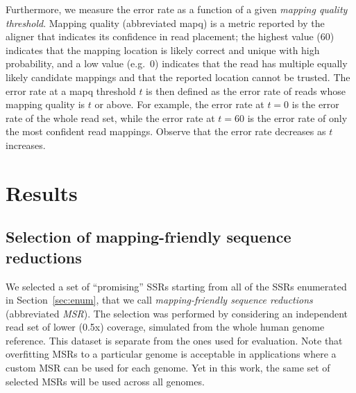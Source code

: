 \documentclass[
  11pt,
  twoside]{scrbook}
\begin{document}
Furthermore, we measure the error rate as a function of a given \emph{mapping quality
threshold}. Mapping quality (abbreviated mapq) is a metric reported by the
aligner that indicates its confidence in read placement; the highest value (60)
indicates that the mapping location is likely correct and unique with high
probability, and a low value (e.g.~0) indicates that the read has multiple
equally likely candidate mappings and that the reported location cannot be
trusted. The error rate at a mapq threshold \(t\) is then defined as the error
rate of reads whose mapping quality is \(t\) or above. For example, the error rate
at \(t=0\) is the error rate of the whole read set, while the error rate at \(t=60\)
is the error rate of only the most confident read mappings. Observe that the
error rate decreases as \(t\) increases.

\hypertarget{hpc-results}{%
\section{Results}\label{hpc-results}}

\hypertarget{selection-of-mapping-friendly-sequence-reductions}{%
\subsection{Selection of mapping-friendly sequence reductions}\label{selection-of-mapping-friendly-sequence-reductions}}

We selected a set of ``promising'' SSRs starting from all of the SSRs enumerated
in Section~\ref{sec:enum}, that we call \emph{mapping-friendly sequence reductions}
(abbreviated \emph{MSR}). The selection was performed by considering an independent
read set of lower (0.5x) coverage, simulated from the whole human genome
reference. This dataset is separate from the ones used for evaluation. Note that
overfitting MSRs to a particular genome is acceptable in applications where a
custom MSR can be used for each genome. Yet in this work, the same set of
selected MSRs will be used across all genomes.
\end{document}
